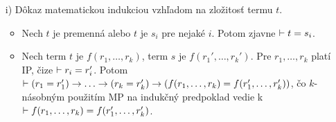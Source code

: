 \begin{dokaz}
\noindent
\begin{itemize}
    \item[i)] Dôkaz matematickou indukciou vzhľadom na zložitosť termu $t$.
        \begin{itemize}
        \item Nech $t$ je premenná alebo $t$ je $s_i$ pre nejaké $i$.
            Potom zjavne $\vdash t=s_i$.

        \item Nech term $t$ je $f(r_1,\dots,r_k)$, 
            term $s$ je $f(r_1',\dots,r_k')$.
            Pre $r_1,\dots,r_k$ platí IP, čize $\vdash r_i = r_i'$.
            Potom $\provable (r_1=r_1') \implies  \dots \implies
                (r_k = r_k') \implies (f(r_1,\dots,r_k) = f(r_1',
                    \dots, r_k'))$, čo $k$-násobným použitím MP na 
                    indukčný predpoklad vedie k
                    $\vdash f(r_1,\dots,r_k) = f(r_1', \dots,
                    r_k')$.
                

\end{itemize}
\end{itemize}
\end{dokaz}
